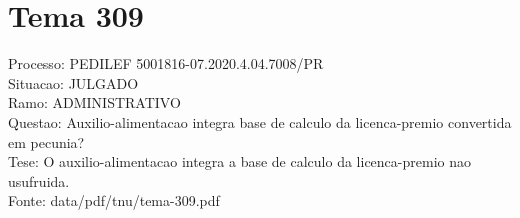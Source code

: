 \documentclass[12pt]{article}
\begin{document}
\section*{Tema 309}
Processo: PEDILEF 5001816-07.2020.4.04.7008/PR\\
Situacao: JULGADO\\
Ramo: ADMINISTRATIVO\\
Questao: Auxilio-alimentacao integra base de calculo da licenca-premio convertida em pecunia?\\
Tese: O auxilio-alimentacao integra a base de calculo da licenca-premio nao usufruida.\\
Fonte: data/pdf/tnu/tema-309.pdf
\end{document}
